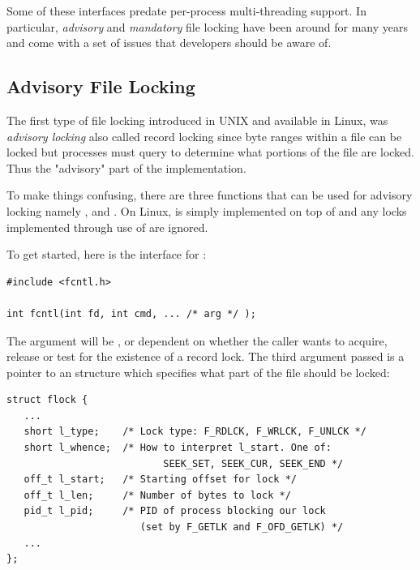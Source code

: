 Some of these interfaces predate per-process multi-threading support. In particular, \textit{advisory} and \textit{mandatory} file locking have been around for many years and come with a set of issues that developers should be aware of. 


\subsection{Advisory File Locking}

The first type of file locking introduced in UNIX and available in Linux, was \textit{advisory locking} also called record locking since byte ranges within a file can be locked but processes must query to determine what portions of the file are locked. Thus the "advisory" part of the implementation.

To make things confusing, there are three functions that can be used for advisory locking namely ,  and . On Linux,  is simply implemented on top of  and any locks implemented through use of  are ignored.

To get started, here is the interface for :

\begin{lstlisting}
#include <fcntl.h>

int fcntl(int fd, int cmd, ... /* arg */ );
\end{lstlisting}

\noindent
The  argument will be ,   or  dependent on whether the caller wants to acquire, release or test for the existence of a record lock. The third argument passed is a pointer to an  structure which specifies what part of the file should be locked:
\begin{lstlisting}
struct flock {
   ... 
   short l_type;    /* Lock type: F_RDLCK, F_WRLCK, F_UNLCK */
   short l_whence;  /* How to interpret l_start. One of:
                           SEEK_SET, SEEK_CUR, SEEK_END */
   off_t l_start;   /* Starting offset for lock */
   off_t l_len;     /* Number of bytes to lock */
   pid_t l_pid;     /* PID of process blocking our lock
                       (set by F_GETLK and F_OFD_GETLK) */
   ... 
}; 
\end{lstlisting}


